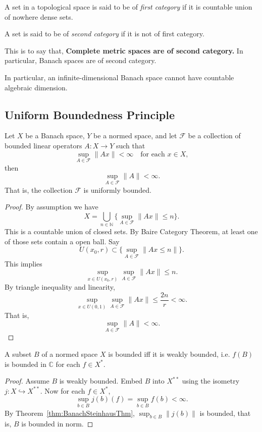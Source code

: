 A set in a topological space is said to be of \textit{first category} if it is countable union of nowhere dense sets.

A set is said to be of \textit{second category} if it is not of first category.

This is to say that, \textbf{Complete metric spaces are of second category.} In particular, Banach spaces are of second category.

In particular, an infinite-dimensional Banach space cannot have countable algebraic dimension.

\subsection{Uniform Boundedness Principle}

\begin{theorem} 
	\label{thm:BanachSteinhausThm}

Let $X $ be a Banach space, $Y$ be a normed space, and let $\mathcal{F}$ be a collection of bounded linear operators $A: X \to Y$ such that
\[
	\sup_{A \in \mathcal{F}} \|A x\| < \infty \quad \text{for each }x \in X
,\]
then
\[
	\sup _{A \in \mathcal{F}} \|A\| < \infty 
.\] 
That is, the collection $\mathcal{F}$ is uniformly bounded.
\end{theorem}
\begin{proof}
	By assumption we have
	\[
		X = \bigcup_{n \in \mathbb{N}} \{\sup_{A \in \mathcal{F}} \|A x\| \le n\} 
	.\] 
	This is a countable union of closed sets. By Baire Category Theorem, at least one of those sets contain a open ball. Say
	\[
		U(x_0, r) \subset \{\sup_{A \in \mathcal{F}} \|A x \le n\|\} 
	.\] 
	This implies
	\[
		\sup _{x \in U(x_0, r)} \sup_{A \in \mathcal{F}} \|A x\| \le n
	.\] 
	By triangle inequality and linearity,
	\[
		\sup _{x \in U(0, 1)} \sup _{A \in \mathcal{F}} \|A x\| \le \frac{2 n}{r} < \infty 
	.\] 
	That is,
	\[
		\sup _{A \in \mathcal{F}}\|A\| < \infty 
	.\] 
\end{proof}

\begin{corollary}
	\label{cor:WeaklyBounded}
	
	A subset $B$ of a normed space $X$ is bounded iff it is weakly bounded, i.e. $f(B)$ is bounded in $\mathbb{C}$ for each $f \in X^*$.
\end{corollary}
\begin{proof}
	Assume $B$ is weakly bounded.
	 Embed $B$ into $X^{**}$ using the isometry $j: X \hookrightarrow X^{* *}$. Now for each $f \in X^*$,
	 \[
	 	\sup _{b \in B} j(b)(f) = \sup _{b \in B} f(b) < \infty 
	 .\] 
	 By Theorem~\ref{thm:BanachSteinhausThm}, $\sup _{b \in B} \|j(b)\|$ is bounded, that is, $B$ is bounded in norm.
\end{proof}

